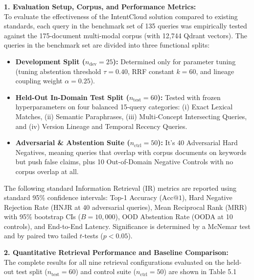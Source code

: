 \documentclass[a4paper,12pt]{article}
\begin{document}
\noindent\textbf{1. Evaluation Setup, Corpus, and Performance Metrics:}\\
To evaluate the effectiveness of the IntentCloud solution compared to existing standards, each query in the benchmark set of 135 queries was empirically tested against the 175-document multi-modal corpus (with 12,744 Qdrant vectors). The queries in the benchmark set are divided into three functional splits:
\begin{itemize}
    \setlength{\itemsep}{1pt}
    \setlength{\parskip}{0pt}
    \item \textbf{Development Split ($n_{\text{dev}} = 25$):} Determined only for parameter tuning (tuning abstention threshold $\tau = 0. 40$, RRF constant $k=60$, and lineage coupling weight $\alpha = 0. 25$).
    \item \textbf{Held-Out In-Domain Test Split ($n_{\text{test}} = 60$):} Tested with frozen hyperparameters on four balanced 15-query categories: (i) Exact Lexical Matches, (ii) Semantic Paraphrases, (iii) Multi-Concept Intersecting Queries, and (iv) Version Lineage and Temporal Recency Queries.
    \item \textbf{Adversarial \& Abstention Suite ($n_{\text{ctrl}} = 50$):} It's 40 Adversarial Hard Negatives, meaning queries that overlap with corpus documents on keywords but push false claims, plus 10 Out-of-Domain Negative Controls with no corpus overlap at all.
\end{itemize}
The following standard Information Retrieval (IR) metrics are reported using standard 95\% confidence intervals: Top-1 Accuracy ($\text{Acc}@1$), Hard Negative Rejection Rate (HNJR at 40 adversarial queries), Mean Reciprocal Rank (MRR) with 95\% bootstrap CIs ($B = 10,000$), OOD Abstention Rate (OODA at 10 controls), and End-to-End Latency. Significance is determined by a McNemar test and by paired two tailed $t$-tests ($p<0.05$).

\vspace{0.3em}
\noindent\textbf{2. Quantitative Retrieval Performance and Baseline Comparison:}\\
The complete results for all nine retrieval configurations evaluated on the held-out test split ($n_{\text{test}}=60$) and control suite ($n_{\text{ctrl}}=50$) are shown in Table 5.1
\end{document}
